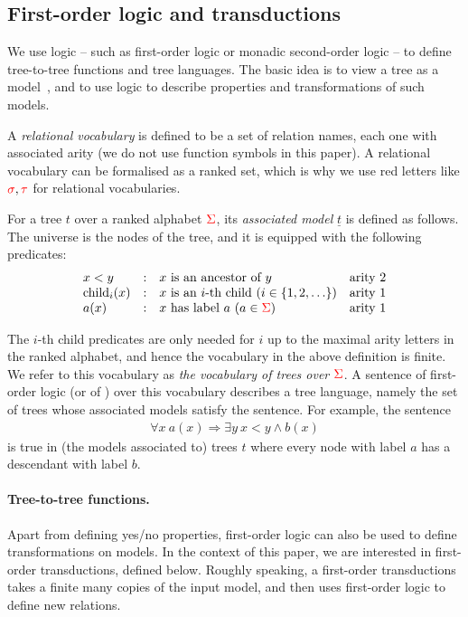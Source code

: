   
\subsection{First-order logic and transductions}
We use  logic -- such as first-order logic or monadic second-order logic --  to define tree-to-tree functions and tree languages. The basic idea is to view a tree as a model~\cite[Section 3]{thomas1997languages}, and to use logic to describe properties and transformations of such models.

A \emph{relational vocabulary} is defined to be a set of relation names, each one with associated arity (we do not use function symbols in this paper). A relational vocabulary can be formalised as a ranked set, which is why we use red letters like ${\color{red}{\sigma}}, {\color{red}{\tau}}$ for relational vocabularies. 

\begin{definition}\label{def:tree-model}
   For a tree $t$  over a ranked alphabet ${\color{red}{\Sigma}}$, its \emph{associated model} $\underline t$ is defined as follows. The  universe is the nodes of the tree, and it is equipped with the following predicates:
   $$\begin{array}{lcll}
   x<y & : &   \text{$x$ is an ancestor of $y$} & \text{arity 2}\\
   \mathrm{child}_i(x) & : & \text{$x$ is an $i$-th child ($i\in \{1,2,\ldots\}$)} & \text{arity 1} \\
   a(x) & : &   \text{$x$ has label $a$ ($a \in {\color{red}{\Sigma}}$)} & \text{arity 1}
   \end{array}$$
    \end{definition}

The $i$-th child predicates are only needed for $i$ up to the maximal arity letters in the ranked alphabet, and hence the vocabulary in the above definition is finite. We refer to this vocabulary as \emph{the vocabulary of trees over ${\color{red}{\Sigma}}$}.
 A sentence of first-order logic (or of \mso)  over this vocabulary   describes a tree language, namely the set of trees whose associated models satisfy the sentence.  For example, the sentence 
 \begin{align*}
 \forall x \ a(x) \Rightarrow \exists y \ x < y \land b(x)
 \end{align*} 
 is true in (the models associated to)  trees $t$ where every node with label $a$ has a descendant with label $b$.  
 
 \paragraph*{Tree-to-tree functions.}
 Apart from defining yes/no properties, first-order logic can also be used  to define transformations on  models. In the context of this paper, we are interested in first-order transductions, defined below.  Roughly speaking, a first-order transductions takes a finite many copies of the input model, and then uses first-order logic to define new relations.

